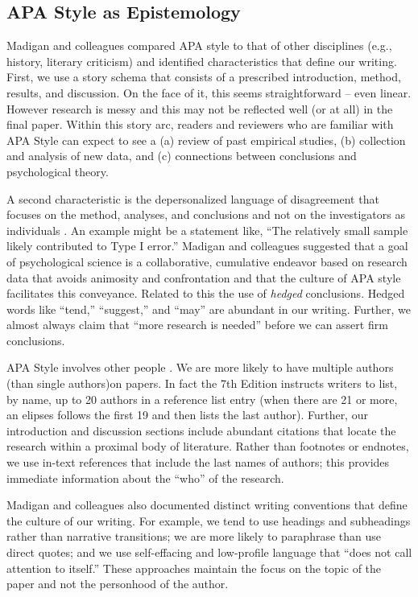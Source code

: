 \documentclass[
  11pt,
]{book}
\begin{document}
\hypertarget{apa-style-as-epistemology}{%
\subsection{APA Style as Epistemology}\label{apa-style-as-epistemology}}

Madigan \citeyearpar{madigan_language_1995} and colleagues compared APA style to that of other disciplines (e.g., history, literary criticism) and identified characteristics that define our writing. First, we use a story schema that consists of a prescribed introduction, method, results, and discussion. On the face of it, this seems straightforward -- even linear. However research is messy and this may not be reflected well (or at all) in the final paper. Within this story arc, readers and reviewers who are familiar with APA Style can expect to see a (a) review of past empirical studies, (b) collection and analysis of new data, and (c) connections between conclusions and psychological theory.

A second characteristic is the depersonalized language of disagreement that focuses on the method, analyses, and conclusions and not on the investigators as individuals \citep{madigan_language_1995}. An example might be a statement like, ``The relatively small sample likely contributed to Type I error.'' Madigan and colleagues suggested that a goal of psychological science is a collaborative, cumulative endeavor based on research data that avoids animosity and confrontation and that the culture of APA style facilitates this conveyance. Related to this the use of \emph{hedged} conclusions. Hedged words like ``tend,'' ``suggest,'' and ``may'' are abundant in our writing. Further, we almost always claim that ``more research is needed'' before we can assert firm conclusions.

APA Style involves other people \citep{madigan_language_1995}. We are more likely to have multiple authors (than single authors)on papers. In fact the 7th Edition instructs writers to list, by name, up to 20 authors in a reference list entry (when there are 21 or more, an elipses follows the first 19 and then lists the last author). Further, our introduction and discussion sections include abundant citations that locate the research within a proximal body of literature. Rather than footnotes or endnotes, we use in-text references that include the last names of authors; this provides immediate information about the ``who'' of the research.

Madigan \citeyearpar{madigan_language_1995} and colleagues also documented distinct writing conventions that define the culture of our writing. For example, we tend to use headings and subheadings rather than narrative transitions; we are more likely to paraphrase than use direct quotes; and we use self-effacing and low-profile language that ``does not call attention to itself.'' These approaches maintain the focus on the topic of the paper and not the personhood of the author.
\end{document}
